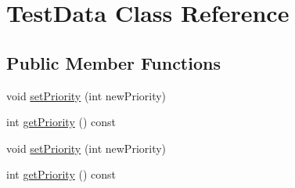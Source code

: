 \hypertarget{class_test_data}{\section{Test\-Data Class Reference}
\label{class_test_data}
}
\subsection*{Public Member Functions}
\begin{DoxyCompactItemize}
\item 
void \hyperlink{class_test_data_af6c76355a3ab75cd07ca6bba7dfe2115}{set\-Priority} (int new\-Priority)
\item 
int \hyperlink{class_test_data_a11f3f060f167d1989c94bf94860aed20}{get\-Priority} () const 
\item 
void \hyperlink{class_test_data_af6c76355a3ab75cd07ca6bba7dfe2115}{set\-Priority} (int new\-Priority)
\item 
int \hyperlink{class_test_data_a11f3f060f167d1989c94bf94860aed20}{get\-Priority} () const 
\end{DoxyCompactItemize}


